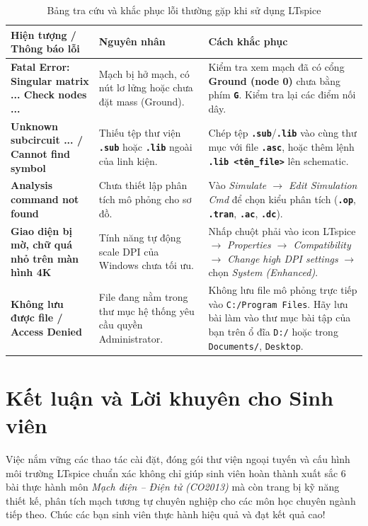 \documentclass[11pt,a4paper]{article}
\newcommand{\code}[1]{\texttt{\color{navy}\textbf{#1}}}
\newcommand{\pathdir}[1]{\texttt{\color{darkblue}#1}}
\newcommand{\key}[1]{\colorbox{gray!20}{\texttt{\textbf{#1}}}}
\begin{document}
\begin{table}[H]\centering\small
\caption{Bảng tra cứu và khắc phục lỗi thường gặp khi sử dụng LTspice}\label{tab:trouble}
\renewcommand{\arraystretch}{1.35}
\begin{tabularx}{\linewidth}{|p{4.2cm}|p{5.5cm}|X|}\hline
\rowcolor{navy!15}\textbf{Hiện tượng / Thông báo lỗi} & \textbf{Nguyên nhân} & \textbf{Cách khắc phục} \\ \hline
\textbf{Fatal Error: Singular matrix ... Check nodes ...} & Mạch bị hở mạch, có nút lơ lửng hoặc chưa đặt mass (Ground). & Kiểm tra xem mạch đã có cổng \textbf{Ground (node 0)} chưa bằng phím \key{G}. Kiểm tra lại các điểm nối dây. \\ \hline
\textbf{Unknown subcircuit ... / Cannot find symbol} & Thiếu tệp thư viện \code{.sub} hoặc \code{.lib} ngoài của linh kiện. & Chép tệp \code{.sub}/\code{.lib} vào cùng thư mục với file \code{.asc}, hoặc thêm lệnh \code{.lib <tên\_file>} lên schematic. \\ \hline
\textbf{Analysis command not found} & Chưa thiết lập phân tích mô phỏng cho sơ đồ. & Vào \textit{Simulate $\rightarrow$ Edit Simulation Cmd} để chọn kiểu phân tích (\code{.op}, \code{.tran}, \code{.ac}, \code{.dc}). \\ \hline
\textbf{Giao diện bị mờ, chữ quá nhỏ trên màn hình 4K} & Tính năng tự động scale DPI của Windows chưa tối ưu. & Nhấp chuột phải vào icon LTspice $\rightarrow$ \textit{Properties $\rightarrow$ Compatibility $\rightarrow$ Change high DPI settings} $\rightarrow$ chọn \textit{System (Enhanced)}. \\ \hline
\textbf{Không lưu được file / Access Denied} & File đang nằm trong thư mục hệ thống yêu cầu quyền Administrator. & Không lưu file mô phỏng trực tiếp vào \pathdir{C:/Program Files}. Hãy lưu bài làm vào thư mục bài tập của bạn trên ổ đĩa \pathdir{D:/} hoặc trong \pathdir{Documents/}, \pathdir{Desktop}. \\ \hline
\end{tabularx}
\end{table}

\section{Kết luận và Lời khuyên cho Sinh viên}
Việc nắm vững các thao tác cài đặt, đóng gói thư viện ngoại tuyến và cấu hình môi trường LTspice chuẩn xác không chỉ giúp sinh viên hoàn thành xuất sắc 6 bài thực hành môn \textit{Mạch điện -- Điện tử (CO2013)} mà còn trang bị kỹ năng thiết kế, phân tích mạch tương tự chuyên nghiệp cho các môn học chuyên ngành tiếp theo. Chúc các bạn sinh viên thực hành hiệu quả và đạt kết quả cao!
\end{document}
